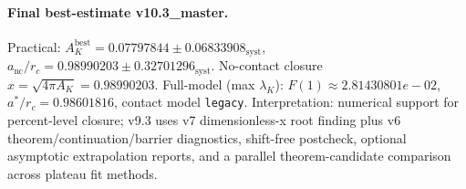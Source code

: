 \paragraph{Final best-estimate v10.3_master.}
Practical: $A_K^{\mathrm{best}} = 0.07797844 \pm 0.06833908_{\mathrm{syst}}$, $a_{\mathrm{nc}}/r_c = 0.98990203 \pm 0.32701296_{\mathrm{syst}}$.
No-contact closure $x = \sqrt{4\pi A_K} = 0.98990203$.
Full-model (max $\lambda_K$): $F(1) \approx 2.81430801e-02$, $a^*/r_c = 0.98601816$, contact model \texttt{legacy}.
Interpretation: numerical support for percent-level closure; v9.3 uses v7 dimensionless-x root finding plus v6 theorem/continuation/barrier diagnostics, shift-free postcheck, optional asymptotic extrapolation reports, and a parallel theorem-candidate comparison across plateau fit methods.

